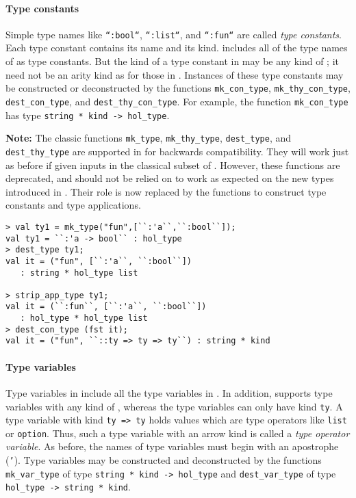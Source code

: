 \paragraph{Type constants}

Simple type names like \texttt{``:bool``}, \texttt{``:list``}, and
\texttt{``:fun``} are called {\it type constants}.
Each type constant contains its name and its kind.
\HOLW{} includes all of the type names of \HOL{} as type constants.
But the kind of a type constant in \HOLW{} may be any kind of \HOLW;
it need not be an arity kind as for those in \HOL.
Instances of these type constants
may be constructed or deconstructed by the \ML{} functions
\texttt{mk\_con\_type},
\texttt{mk\_thy\_con\_type},
\texttt{dest\_con\_type},
and \texttt{dest\_thy\_con\_type}.
For example, the function \texttt{mk\_con\_type} has \ML{} type
\texttt{string * kind -> hol\_type}.

{\bf Note:}
The classic \HOL{} functions \texttt{mk\_type},
\texttt{mk\_thy\_type},
\texttt{dest\_type},
and \texttt{dest\_thy\_type}
are supported in \HOLW{} for backwards compatibility.
They will work just as before if given inputs in the classical
\HOL{} subset of \HOLW.  However, these functions are deprecated, and should
not be relied on to work as expected on the new types introduced in \HOLW.
Their role is now replaced by the \ML{} functions to
construct type constants and type applications.
%
\begin{session}
\begin{verbatim}
> val ty1 = mk_type("fun",[``:'a``,``:bool``]);
val ty1 = ``:'a -> bool`` : hol_type
> dest_type ty1;
val it = ("fun", [``:'a``, ``:bool``])
   : string * hol_type list

> strip_app_type ty1;
val it = (``:fun``, [``:'a``, ``:bool``])
   : hol_type * hol_type list
> dest_con_type (fst it);
val it = ("fun", ``::ty => ty => ty``) : string * kind
\end{verbatim}
\end{session}

\paragraph{Type variables}

Type variables in \HOLW{} include all the type variables in \HOL.
In addition, \HOLW{} supports type variables with any kind of \HOLW{},
whereas the \HOL{}
type variables can only have kind \texttt{ty}.
A type variable with kind \texttt{ty => ty} holds values which
are type operators like \texttt{list} or \texttt{option}.
Thus, such a type variable with an arrow kind is called a {\it type operator
variable}.
As before, the names of type variables must begin with an apostrophe
(\texttt{'}).  Type variables may be
constructed and deconstructed by the \ML{} functions
\texttt{mk\_var\_type} of type \texttt{string * kind -> hol\_type} and
\texttt{dest\_var\_type} of type \texttt{hol\_type -> string * kind}.

